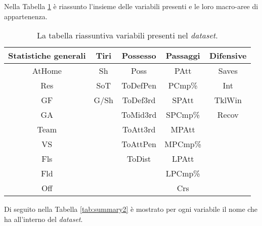 Nella Tabella \ref{tab:summary} è riassunto l'insieme delle variabili presenti e le loro macro-aree di appartenenza.\\
\begin{table}[!htb]%
	
	\renewcommand{\arraystretch}{1.7}
	\centering
	\begin{tabular}{c c c c c}
		\hline	
		
		\textbf{Statistiche generali} & \textbf{Tiri} & \textbf{Possesso} & \textbf{Passaggi} & \textbf{Difensive} \\	
		\hline			
		AtHome & Sh & Poss & PAtt & Saves\\
		Res & SoT & ToDefPen & PCmp\% & Int\\
		GF & G/Sh & ToDef3rd & SPAtt & TklWin\\
		GA &  & ToMid3rd & SPCmp\% & Recov\\
		Team &  & ToAtt3rd & MPAtt&\\
		VS &  & ToAttPen & MPCmp\% &\\
		Fls &  & ToDist & LPAtt &\\
		Fld &  &  & LPCmp\% &\\
		Off &  &  & Crs \\
		\hline
		
		
	\end{tabular} \hbox{}
	
	\caption{La tabella riassuntiva variabili presenti nel \emph{dataset}.} \label{tab:summary}
\end{table}

Di seguito nella Tabella \ref{tab:summary2} è mostrato per ogni variabile il nome che ha all'interno del \emph{dataset}.


